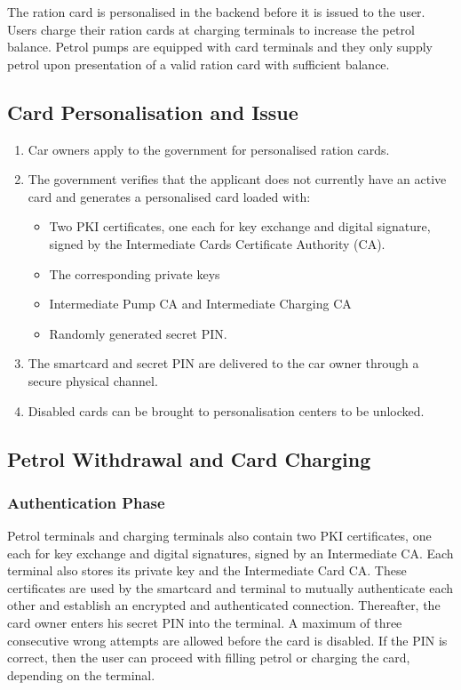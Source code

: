The ration card is personalised in the backend before it is issued to the user. Users charge their ration cards at charging terminals to increase the petrol balance. Petrol pumps are equipped with card terminals and they only supply petrol upon presentation of a valid ration card with sufficient balance.

\subsection{Card Personalisation and Issue}

\begin{enumerate}
  \item Car owners apply to the government for personalised ration cards.
  \item The government verifies that the applicant does not currently have an active card and generates a personalised card loaded with: 
	\begin{itemize}
	  \item Two PKI certificates, one each for key exchange and digital signature, signed by the Intermediate Cards Certificate Authority (CA).
	  \item The corresponding private keys
	  \item Intermediate Pump CA and Intermediate Charging CA
	  \item Randomly generated secret PIN.
	\end{itemize}
  \item The smartcard and secret PIN are delivered to the car owner through a secure physical channel.
  \item Disabled cards can be brought to personalisation centers to be unlocked.
\end{enumerate}

\subsection{Petrol Withdrawal and Card Charging}
\subsubsection{Authentication Phase}
Petrol terminals and charging terminals also contain two PKI certificates, one each for key exchange and digital signatures, signed by an Intermediate CA. Each terminal also stores its private key and the Intermediate Card CA. These certificates are used by the smartcard and terminal to mutually authenticate each other and establish an encrypted and authenticated connection. Thereafter, the card owner enters his secret PIN into the terminal. A maximum of three consecutive wrong attempts are allowed before the card is disabled. If the PIN is correct, then the user can proceed with filling petrol or charging the card, depending on the terminal.

